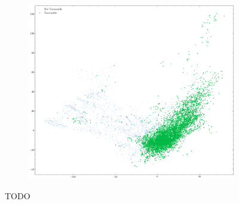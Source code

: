 \documentclass[../document.tex]{subfiles}
\begin{document}
\begin{figure}[H]
\begin{subfigure}[b]{0.48\textwidth}
    \end{subfigure}
    \begin{subfigure}[b]{0.48\textwidth}
        \includegraphics[width=\linewidth]{../img/5/pca/pca-test-1.png}
    \end{subfigure}
\caption{TODO}
\end{figure}
% 
% 
\end{document}
